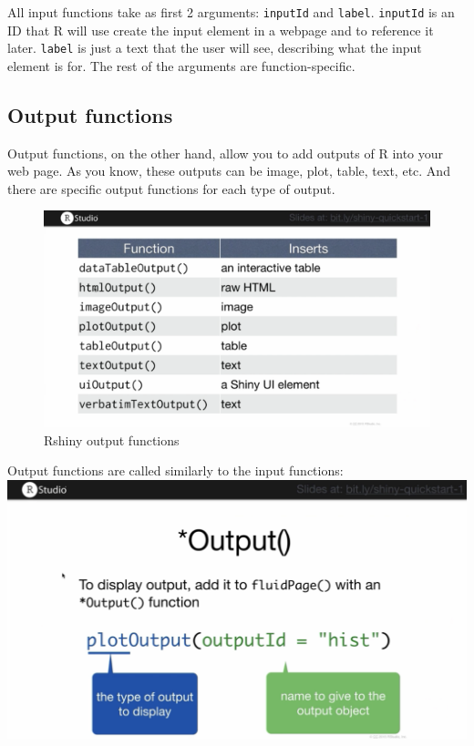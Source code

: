 \documentclass[
]{book}
\begin{document}
All input functions take as first 2 arguments: \texttt{inputId} and \texttt{label}. \texttt{inputId} is an ID that R will use create the input element in a webpage and to reference it later. \texttt{label} is just a text that the user will see, describing what the input element is for. The rest of the arguments are function-specific.

\hypertarget{output-functions}{%
\subsection{Output functions}\label{output-functions}}

Output functions, on the other hand, allow you to add outputs of R into your web page. As you know, these outputs can be image, plot, table, text, etc. And there are specific output functions for each type of output.

\begin{figure}
\centering
\includegraphics{images/outputFunctions.png}
\caption{Rshiny output functions}
\end{figure}

Output functions are called similarly to the input functions:
\includegraphics{images/callOutputFunctions.png}
\end{document}
